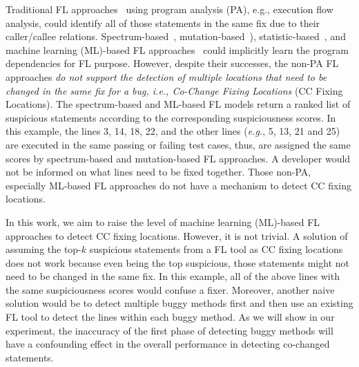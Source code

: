 Traditional FL approaches~\cite{zhang-fse09,ICICA-10} using program
analysis (PA), e.g., execution flow analysis, could identify all of
those statements in the same fix due to their caller/callee
relations. Spectrum-based~\cite{tarantula05,Ochiai},
mutation-based~\cite{MUSE,papadakis2012using,Metallaxis}),
statistic-based~\cite{liblit-pldi05}, and machine learning (ML)-based FL
approaches~\cite{DeepFL,icse21-fl} could implicitly learn the program
dependencies for FL purpose. However, despite their successes, the non-PA FL
approaches {\em do not support the detection of multiple locations
  that need to be changed in the same fix for a bug, i.e., Co-Change
  Fixing Locations} (CC Fixing Locations).
%
The spectrum-based and ML-based FL models return a ranked list
of suspicious statements according to the corresponding suspiciousness
scores. In this example, the lines 3, 14, 18, 22, and the other lines
({\em e.g.}, 5, 13, 21 and 25) are executed in the same passing or
failing test cases, thus, are assigned the same scores by
spectrum-based and mutation-based FL approaches. A developer would not
be informed on what lines need to be fixed together. Those non-PA,
especially ML-based FL approaches do not have a mechanism to detect
CC fixing locations.

In this work, we aim to raise the level of machine learning (ML)-based FL approaches to
detect CC fixing locations. However, it is not trivial. A solution of
assuming the top-$k$ suspicious statements from a FL tool as CC fixing
locations does not work because even being the top suspicious, those
statements might not need to be changed in the same fix. In this
example, all of the above lines with the same suspiciousness scores
would confuse a fixer. Moreover, another naive solution would be to
detect multiple buggy methods first and then use an existing FL tool
to detect the lines within each buggy method. As we will show in our
experiment, the inaccuracy of the first phase of detecting buggy
methods will have a confounding effect in the overall performance in
detecting co-changed statements.


